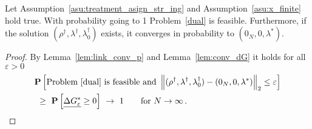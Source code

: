 \begin{theorem}
  \label{th:cons_dual}
Let
Assumption~\eqref{asu:treatment_asign_str_ing} and Assumption~\ref{asu:x_finite} hold true.
  With probability going to 1 Problem~\ref{dual} is feasible.
  Furthermore, if the solution 
$
(\rho^\dagger,\lambda^\dagger,\lambda_0^\dagger)
$
exists,
it
converges in probability to 
$
(0_N,0,\lambda^*)
$.
\end{theorem}
\begin{proof}
  By Lemma~\ref{lem:link_conv_p} and Lemma~\ref{lem:conv_dG}
  it holds for all $\varepsilon>0$
  \begin{align*}
    &
    \P
    \left[ 
      \text{Problem~\ref{dual} is feasible and }
      \norm{
(\rho^\dagger,\lambda^\dagger,\lambda_0^\dagger)
-
(0_N,0,\lambda^*)
      }_2
      \le \varepsilon
    \right]
    \\
    &
    \ 
    \ge
    \ 
    \P
    \left[ \underline{\Delta G^*_\varepsilon}\ge 0 \right]
    \ 
    \to
    \ 
    1
    \qquad
    \text{for}\ 
    N\to\infty
    \,.
  \end{align*}
\end{proof}
